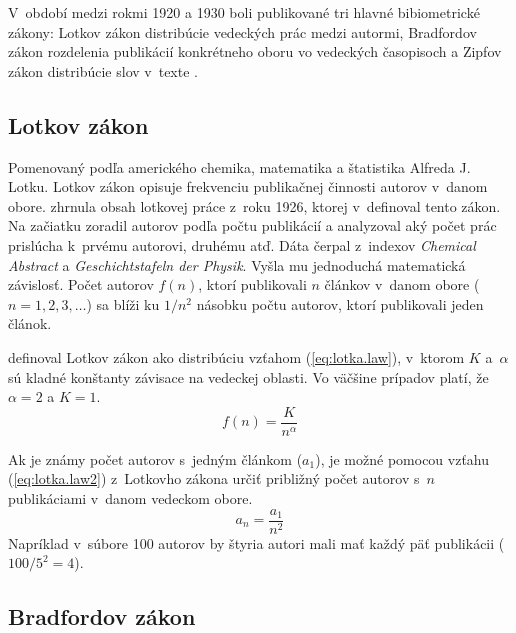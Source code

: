 V~období medzi rokmi 1920 a 1930 boli publikované tri hlavné bibiometrické
zákony: Lotkov zákon distribúcie vedeckých prác medzi autormi, Bradfordov zákon
rozdelenia publikácií konkrétneho oboru vo vedeckých časopisoch a Zipfov
zákon
distribúcie slov v~texte \citep{Bellis2009}.


\subsection{Lotkov zákon}

Pomenovaný podľa amerického chemika, matematika a štatistika Alfreda J.\,Lotku.
Lotkov zákon opisuje frekvenciu publikačnej činnosti autorov v~danom obore.
\citet{Ondrisova2011} zhrnula obsah lotkovej práce z~roku 1926, ktorej
v~definoval tento zákon.  Na začiatku zoradil autorov podľa počtu publikácií a
analyzoval aký počet prác prislúcha k~prvému autorovi, druhému atď.  Dáta čerpal
z~indexov \emph{Chemical Abstract} a \emph{Geschichtstafeln der Physik}.  Vyšla
mu jednoduchá matematická závislosť.  Počet autorov $f(n)$, ktorí publikovali
$n$ článkov v~danom obore ($n = 1, 2, 3, \dots$) sa blíži ku $1/n^2$ násobku
počtu autorov, ktorí publikovali jeden článok.

\citet{Egghe2005} definoval Lotkov zákon ako distribúciu vzťahom
(\ref{eq:lotka.law}), v~ktorom $K$ a~$\alpha$ sú kladné konštanty závisace
na vedeckej oblasti.  Vo väčšine prípadov platí, že $\alpha = 2$ a $K = 1$.
\begin{equation}
\label{eq:lotka.law}
f(n) = \frac{K}{n^\alpha}
\end{equation}

Ak je známy počet autorov s~jedným článkom ($a_1$), je možné pomocou vzťahu
(\ref{eq:lotka.law2}) z~Lotkovho zákona určiť približný počet autorov s~$n$
publikáciami v~danom vedeckom obore.
\begin{equation}
\label{eq:lotka.law2}
a_n = \frac{a_1}{n^2}
\end{equation}
Napríklad v~súbore 100 autorov by štyria autori mali mať každý päť publikácii
($100/5^2 = 4$).


\subsection{Bradfordov zákon}

